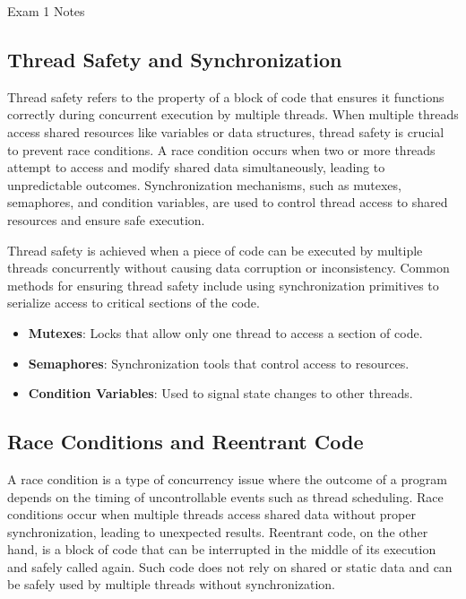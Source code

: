 \begin{examnotes}{Exam 1 Notes}
    \subsection*{Thread Safety and Synchronization}
    
    Thread safety refers to the property of a block of code that ensures it functions correctly during concurrent execution by multiple threads. When multiple threads access shared resources like variables 
    or data structures, thread safety is crucial to prevent race conditions. A race condition occurs when two or more threads attempt to access and modify shared data simultaneously, leading to unpredictable 
    outcomes. Synchronization mechanisms, such as mutexes, semaphores, and condition variables, are used to control thread access to shared resources and ensure safe execution.
    
    \begin{highlight}
        Thread safety is achieved when a piece of code can be executed by multiple threads concurrently without causing data corruption or inconsistency. Common methods for ensuring thread safety include 
        using synchronization primitives to serialize access to critical sections of the code.
        \begin{itemize}
            \item \textbf{Mutexes}: Locks that allow only one thread to access a section of code.
            \item \textbf{Semaphores}: Synchronization tools that control access to resources.
            \item \textbf{Condition Variables}: Used to signal state changes to other threads.
        \end{itemize}
    \end{highlight}
    
    \subsection*{Race Conditions and Reentrant Code}
    
    A race condition is a type of concurrency issue where the outcome of a program depends on the timing of uncontrollable events such as thread scheduling. Race conditions occur when multiple threads 
    access shared data without proper synchronization, leading to unexpected results. Reentrant code, on the other hand, is a block of code that can be interrupted in the middle of its execution and 
    safely called again. Such code does not rely on shared or static data and can be safely used by multiple threads without synchronization.
    

\end{examnotes}
